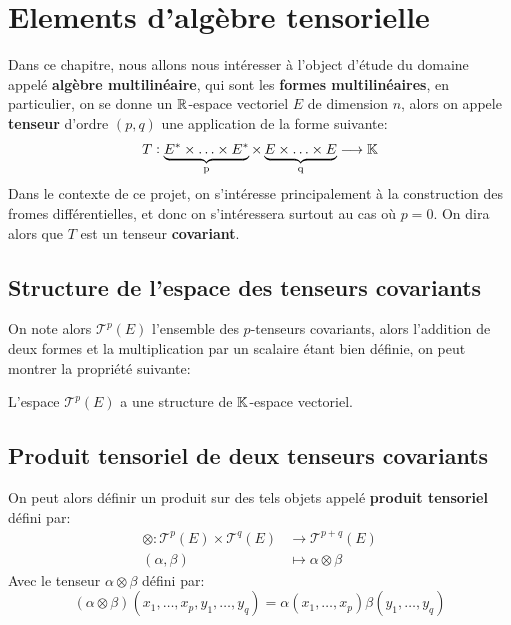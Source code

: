\chapter{Elements d'algèbre tensorielle}
   Dans ce chapitre, nous allons nous intéresser à l'object d'étude du domaine appelé \textbf{algèbre multilinéaire}, qui sont les \textbf{formes multilinéaires}, en particulier, on se donne un \(\mathbb{R}\)-espace vectoriel \(E\) de dimension \( n \), alors on appele \textbf{tenseur} d'ordre \((p, q)\) une application de la forme suivante:
   \begin{align*}
      T : \underbrace{E^* \times \ldots \times E^*}_\text{p} \times \underbrace{E \times \ldots \times E}_\text{q} \longrightarrow \mathbb{K}
   \end{align*}
   Dans le contexte de ce projet, on s'intéresse principalement à la construction des fromes différentielles, et donc on s'intéressera surtout au cas où \( p = 0 \). On dira alors que \( T \) est un tenseur \textbf{covariant}.
   \section{Structure de l'espace des tenseurs covariants}
   On note alors \(\mathscr{T}^p(E)\) l'ensemble des \(p\)-tenseurs covariants, alors l'addition de deux formes et la multiplication par un scalaire étant bien définie, on peut montrer la propriété suivante:
   \begin{center}
      L'espace \( \mathscr{T}^p(E) \) a une structure de \( \mathbb{K} \)-espace vectoriel.
   \end{center}
   \section{Produit tensoriel de deux tenseurs covariants}
   On peut alors définir un produit sur des tels objets appelé \textbf{produit tensoriel} défini par:
   \begin{align*}
      \otimes : \mathscr{T}^p(E) \times \mathscr{T}^q(E) &\longrightarrow \mathscr{T}^{p+q}(E)\\
      (\alpha, \beta) &\longmapsto \alpha \otimes \beta
   \end{align*}
   Avec le tenseur \(\alpha \otimes \beta\) défini par:
   \[
      (\alpha \otimes \beta)(x_1, \ldots, x_p, y_1, \ldots, y_q) = \alpha(x_1, \ldots, x_p)\beta(y_1, \ldots, y_q)
   \]
